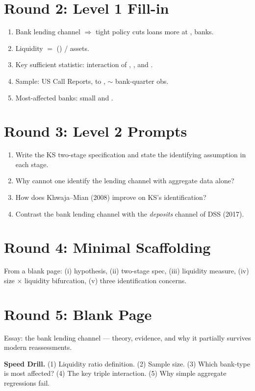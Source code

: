 \documentclass[11pt]{article}
\newcommand{\blank}[1]{\underline{\hspace{#1}}}
\begin{document}
\section*{Round 2: Level 1 Fill-in}
\begin{enumerate}
\item Bank lending channel $\Rightarrow$ tight policy cuts loans more at \blank{2cm}, \blank{2cm} banks.
\item Liquidity $=$ (\blank{2cm}) / assets.
\item Key sufficient statistic: interaction of \blank{2cm}, \blank{2cm}, and \blank{2cm}.
\item Sample: US Call Reports, \blank{2cm} to \blank{2cm}, $\sim$\blank{1cm} bank-quarter obs.
\item Most-affected banks: small and \blank{2cm}.
\end{enumerate}

\section*{Round 3: Level 2 Prompts}
\begin{enumerate}
\item Write the KS two-stage specification and state the identifying assumption in each stage.
\item Why cannot one identify the lending channel with aggregate data alone?
\item How does Khwaja--Mian (2008) improve on KS's identification?
\item Contrast the bank lending channel with the \emph{deposits} channel of DSS (2017).
\end{enumerate}

\section*{Round 4: Minimal Scaffolding}
From a blank page: (i) hypothesis, (ii) two-stage spec, (iii) liquidity measure, (iv) size $\times$ liquidity bifurcation, (v) three identification concerns.

\section*{Round 5: Blank Page}
Essay: the bank lending channel --- theory, evidence, and why it partially survives modern reassessments.

\vspace{6pt}
\begin{drillbox}
\textbf{Speed Drill.} (1) Liquidity ratio definition. (2) Sample size. (3) Which bank-type is most affected? (4) The key triple interaction. (5) Why simple aggregate regressions fail.
\end{drillbox}
\end{document}
